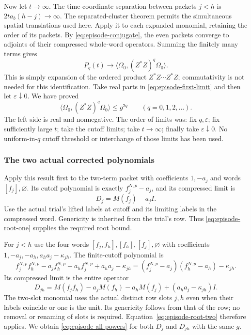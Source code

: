 Now let $t\to\infty$. The time-coordinate separation between packets
$j<h$ is $2ta_b(h-j)\to\infty$. The separated-cluster theorem permits
the simultaneous spatial translations used here. Apply it to each
expanded monomial, retaining the order of its packets. By
\eqref{eq:episode-conjugate}, the even packets converge to adjoints of
their compressed whole-word operators. Summing the finitely many
terms gives
\[
       P_q(t)\longrightarrow
       \langle\Omega_0,(Z^*Z)^q\Omega_0\rangle.
\]
This is simply expansion of the ordered product
$Z^*Z\cdots Z^*Z$; commutativity is not needed for this identification.
Take real parts in \eqref{eq:episode-first-limit} and then let
$\varepsilon\downarrow0$. We have proved
\begin{equation}\label{eq:episode-all-powers}
  \langle\Omega_0,(Z^*Z)^q\Omega_0\rangle\leq g^{2q}
                    \qquad(q=0,1,2,\ldots).
\end{equation}
The left side is real and nonnegative. The order of limits was:
fix $q,\varepsilon$; fix sufficiently large $t$; take the cutoff
limits; take $t\to\infty$; finally take $\varepsilon\downarrow0$.
No uniform-in-$q$ cutoff threshold or interchange of those limits
has been used.

\subsubsection{The two actual corrected polynomials}

Apply this result first to the two-term packet with coefficients $1,-a_j$
and words $[f_j],\varnothing$. Its cutoff polynomial is exactly
$f_j^{N,p}-a_j$, and its compressed limit is
\[
                           D_j=M(f_j)-a_jI.
\]
Use the actual trial's lifted labels at cutoff and its limiting labels
in the compressed word. Genericity is inherited from the trial's row.
Thus \eqref{eq:episode-root-one} supplies the required root bound.

For $j<h$ use the four words
$[f_j,f_h],[f_h],[f_j],\varnothing$ with coefficients
$1,-a_j,-a_h,a_ha_j-\kappa_{jh}$. The finite-cutoff polynomial is
\[
 f_j^{N,p}f_h^{N,p}-a_j f_h^{N,p}-a_h f_j^{N,p}
                  +a_ha_j-\kappa_{jh}
       =(f_j^{N,p}-a_j)(f_h^{N,p}-a_h)-\kappa_{jh}.
\]
Its compressed limit is the entire operator
\[
 D_{jh}=M(f_jf_h)-a_jM(f_h)-a_hM(f_j)
                         +(a_ha_j-\kappa_{jh})I.
\]
The two-slot monomial uses the actual distinct row slots $j,h$ even
when their labels coincide or one is the unit. Its genericity follows
from that of the row; no removal or renaming of slots is required.
Equation~\eqref{eq:episode-root-two} therefore applies. We obtain
\eqref{eq:episode-all-powers} for both $D_j$ and $D_{jh}$ with the
same $g$.


